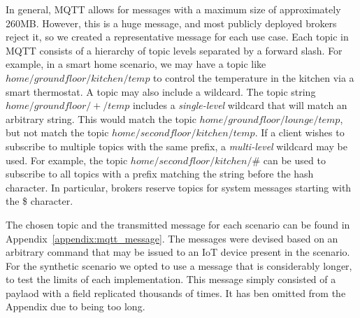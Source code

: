 In general, MQTT allows for messages with a maximum size of approximately 260MB.
However, this is a huge message, and most publicly deployed brokers reject it, so we created a representative message for each use case.
Each topic in MQTT consists of a hierarchy of topic levels separated by a forward slash.
For example, in a smart home scenario, we may have a topic like $home/groundfloor/kitchen/temp$ to control the temperature in the kitchen via a smart thermostat.
A topic may also include a wildcard.
The topic string $home/groundfloor/+/temp$ includes a \textit{single-level} wildcard that will match an arbitrary string.
This would match the topic $home/groundfloor/lounge/temp$, but not match the topic $home/secondfloor/kitchen/temp$.
If a client wishes to subscribe to multiple topics with the same prefix, a \textit{multi-level} wildcard may be used.
For example, the topic $home/secondfloor/kitchen/\#$ can be used to subscribe to all topics with a prefix matching the string before the hash character.
In particular, brokers reserve topics for system messages starting with the \$ character.

The chosen topic and the transmitted message for each scenario can be found in Appendix~\ref{appendix:mqtt_message}.
The messages were devised based on an arbitrary command that may be issued to an IoT device present in the scenario.
For the synthetic scenario we opted to use a message that is considerably longer, to test the limits of each implementation.
This message simply consisted of a paylaod with a field replicated thousands of times.
It has ben omitted from the Appendix due to being too long.